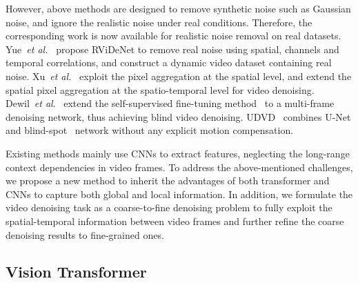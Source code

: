 \documentclass[journal]{IEEEtran}
\begin{document}
However, above methods are designed to remove synthetic noise such as Gaussian noise, and ignore the realistic noise under real conditions. Therefore, the corresponding work
is now available for realistic noise removal on real datasets. 
Yue~\textit{et al.}~\cite{Yue_2020_CVPR} propose RViDeNet to remove real noise using spatial, channels and temporal correlations, and construct a dynamic video dataset containing real noise. Xu~\textit{et al.}~\cite{9110760} exploit the pixel aggregation at the spatial level, and extend the spatial pixel aggregation at the spatio-temporal level for video denoising. Dewil~\textit{et al}.~\cite{9423377} extend the self-supervised fine-tuning method~\cite{8954460} to a multi-frame denoising network, thus achieving blind video denoising. UDVD~\cite{Sheth_2021_ICCV} combines U-Net and blind-spot~\cite{10.5555/3454287.3454913} network without any explicit motion compensation.

Existing methods mainly use CNNs to extract features, neglecting the long-range context dependencies in video frames. To address the above-mentioned challenges, we propose a new method to inherit the advantages of both transformer and CNNs to capture both global and local information. In addition, we formulate the video denoising task as a coarse-to-fine denoising problem to fully exploit the spatial-temporal information between video frames and further refine the coarse denoising results to fine-grained ones. 

\subsection{Vision Transformer}
\end{document}
